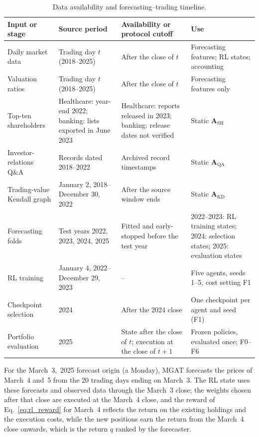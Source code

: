 \documentclass[pdflatex,sn-mathphys-num]{sn-jnl}%
\theoremstyle{thmstyleone}%
\theoremstyle{thmstyletwo}%
\theoremstyle{thmstylethree}%
\begin{document}
\begin{table}[!t]
\centering
\small
\caption{{\color{blue}Data availability and forecasting--trading timeline.}}
\label{tab:timeline}
\setlength{\tabcolsep}{3pt}
\renewcommand{\arraystretch}{1.12}
\color{blue}
\begin{tabular}{@{}p{2.3cm}p{3.3cm}p{3.3cm}p{3.5cm}@{}}
\toprule
Input or stage & Source period & Availability or protocol cutoff & Use \\
\midrule
Daily market data & Trading day $t$ (2018--2025) & After the close of $t$ & Forecasting features; RL states; accounting \\
Valuation ratios & Trading day $t$ (2018--2025) & After the close of $t$ & Forecasting features only \\
Top-ten shareholders & Healthcare: year-end 2022; banking: lists exported in June 2023 & Healthcare: reports released in 2023; banking: release dates not verified & Static $\mathbf{A}_{\mathrm{SH}}$ \\
Investor-relations Q\&A & Records dated 2018--2022 & Archived record timestamps & Static $\mathbf{A}_{\mathrm{QA}}$ \\
Trading-value Kendall graph & January 2, 2018--December 30, 2022 & After the source window ends & Static $\mathbf{A}_{\mathrm{KD}}$ \\
Forecasting folds & Test years 2022, 2023, 2024, 2025 & Fitted and early-stopped before the test year & 2022--2023: RL training states; 2024: selection states; 2025: evaluation states \\
RL training & January 4, 2022--December 29, 2023 & -- & Five agents, seeds 1--5, cost setting F1 \\
Checkpoint selection & 2024 & After the 2024 close & One checkpoint per agent and seed (F1) \\
Portfolio evaluation & 2025 & State after the close of $t$; execution at the close of $t+1$ & Frozen policies, evaluated once; F0--F6 \\
\bottomrule
\end{tabular}
\end{table}

{\color{blue}
For the March~3,~2025 forecast origin (a Monday), MGAT forecasts the prices of March~4 and~5 from the 20 trading days ending on March~3. The RL state uses these forecasts and observed data through the March~3 close; the weights chosen after that close are executed at the March~4 close, and the reward of Eq.~\eqref{eq:rl_reward} for March~4 reflects the return on the existing holdings and the execution costs, while the new positions earn the return from the March~4 close onwards, which is the return $q$ ranked by the forecaster.
\par}
\end{document}
